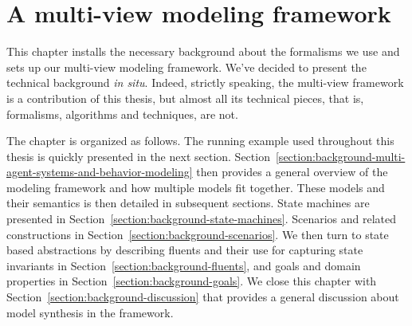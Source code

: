 \chapter{A multi-view modeling framework\label{chapter:framework}}

This chapter installs the necessary background about the formalisms we use and sets up our multi-view modeling framework. We've decided to present the technical background \emph{in situ}. Indeed, strictly speaking, the multi-view framework is a contribution of this thesis, but almost all its technical pieces, that is, formalisms, algorithms and techniques, are not. 

The chapter is organized as follows. The running example used throughout this thesis is quickly presented in the next section. Section~\ref{section:background-multi-agent-systems-and-behavior-modeling} then provides a general overview of the modeling framework and how multiple models fit together. These models and their semantics is then detailed in subsequent sections. State machines are presented in Section~\ref{section:background-state-machines}. Scenarios and related constructions in Section~\ref{section:background-scenarios}. We then turn to state based abstractions by describing fluents and their use for capturing state invariants in Section~\ref{section:background-fluents}, and goals and domain properties in Section~\ref{section:background-goals}. We close this chapter with Section~\ref{section:background-discussion} that provides a general discussion about model synthesis in the framework.








